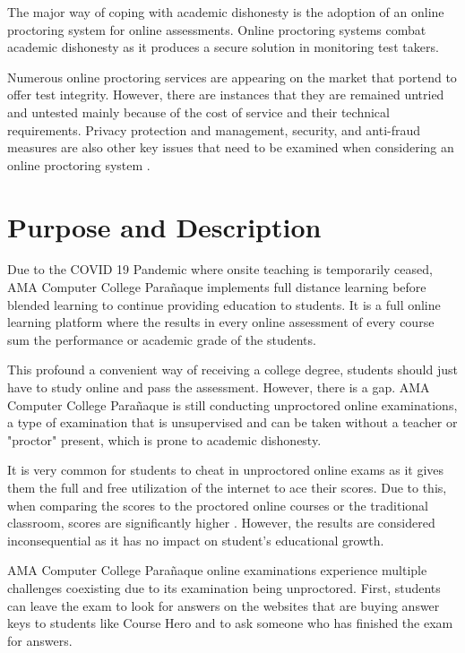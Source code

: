 The major way of coping with academic dishonesty is the adoption of an online proctoring system for online assessments.
Online proctoring systems combat academic dishonesty as it produces a secure solution in monitoring test takers.

Numerous online proctoring services are appearing on the market that portend to offer test integrity.
However, there are instances that they are remained untried and untested mainly because of the cost of service and their technical requirements.
Privacy protection and management, security, and anti-fraud measures are also other key issues that need to be examined when considering an online proctoring system \cite{sietses2016white}.

\section{Purpose and Description}

Due to the COVID 19 Pandemic where onsite teaching is temporarily ceased, AMA Computer College Parañaque implements full distance learning before blended learning to continue providing education to students.
It is a full online learning platform where the results in every online assessment of every course sum the performance or academic grade of the students.

This profound a convenient way of receiving a college degree, students should just have to study online and pass the assessment.
However, there is a gap.
AMA Computer College Parañaque is still conducting unproctored online examinations, a type of examination that is unsupervised and can be taken without a teacher or "proctor" present, which is prone to academic dishonesty.

It is very common for students to cheat in unproctored online exams as it gives them the full and free utilization of the internet to ace their scores.
Due to this, when comparing the scores to the proctored online courses or the traditional classroom, scores are significantly higher \cite{weiner2017comparative}.
However, the results are considered inconsequential as it has no impact on student's educational growth.

AMA Computer College Parañaque online examinations experience multiple challenges coexisting due to its examination being unproctored.
First, students can leave the exam to look for answers on the websites that are buying answer keys to students like Course Hero and to ask someone who has finished the exam for answers.


